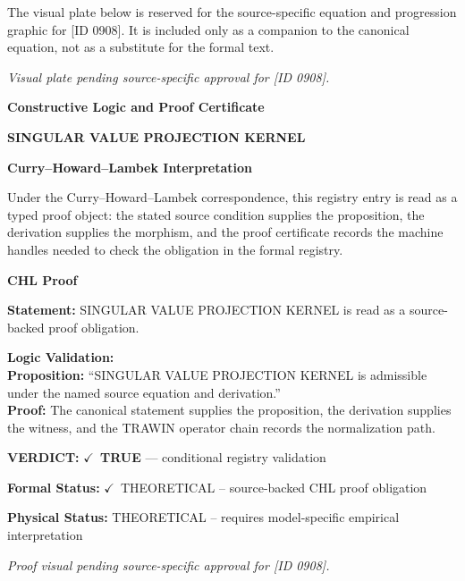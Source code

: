\begingroup\footnotesize\sloppy
The visual plate below is reserved for the source-specific equation and progression graphic for [ID 0908]. It is included only as a companion to the canonical equation, not as a substitute for the formal text.
\par\endgroup
\begingroup\footnotesize\itshape
Visual plate pending source-specific approval for [ID 0908].
\par\endgroup

\clearpage
\begingroup\tzpsupportsetup
\noindent\textbf{\fontsize{10.8pt}{12.8pt}\selectfont [ID 0908] Constructive Logic and Proof Certificate}\par
\noindent\textbf{\fontsize{10pt}{12pt}\selectfont SINGULAR VALUE PROJECTION KERNEL}\par
\vspace{0.45em}
\begingroup
\footnotesize
\setlength{\parskip}{0.22em}
\setlength{\parindent}{0pt}
\noindent\textbf{Curry--Howard--Lambek Interpretation}\par
Under the Curry--Howard--Lambek correspondence, this registry entry is read as a typed proof
object: the stated source condition supplies the proposition, the derivation supplies the
morphism, and the proof certificate records the machine handles needed to check the obligation
in the formal registry.

\vspace{0.45em}
\noindent\textbf{CHL Proof}\par
\textbf{Statement:} SINGULAR VALUE PROJECTION KERNEL is read as a source-backed proof obligation.

\textbf{Logic Validation:}\\
\textbf{Proposition:} ``SINGULAR VALUE PROJECTION KERNEL is admissible under the named source equation and derivation.''\\
\textbf{Proof:} The canonical statement supplies the proposition, the derivation supplies the witness, and the TRAWIN operator chain records the normalization path.

\textbf{VERDICT:} \ensuremath{\checkmark}\ \textbf{TRUE} --- conditional registry validation

\textbf{Formal Status:} \ensuremath{\checkmark}\ THEORETICAL -- source-backed CHL proof obligation

\textbf{Physical Status:} THEORETICAL -- requires model-specific empirical interpretation
\par\vspace{0.45em}
\par
\vfill
\begingroup\footnotesize\itshape
Proof visual pending source-specific approval for [ID 0908].
\par\endgroup
\vfill
\endgroup
\endgroup
